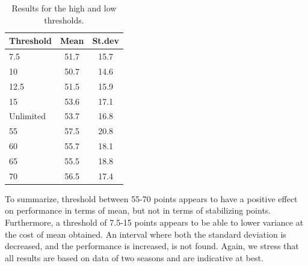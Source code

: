 \begin{table}[H]
\centering
\begin{tabular}{@{}lcc@{}}
\toprule
Threshold & Mean & St.dev \\ \midrule
7.5       & 51.7 & 15.7   \\
10        & 50.7 & 14.6   \\        %
12.5      & 51.5 & 15.9   \\
15        & 53.6 & 17.1   \\
Unlimited & 53.7 & 16.8   \\
55        & 57.5 & 20.8   \\
60        & 55.7 & 18.1   \\
65        & 55.5 & 18.8   \\
70        & 56.5 & 17.4   \\ \bottomrule 
\end{tabular}
\caption{Results for the high and low thresholds.}
\label{tab_high_low_thresholds}
\end{table}

\newpar

To summarize, threshold between 55-70 points appears to have a positive effect on performance in terms of mean, but not in terms of stabilizing points. Furthermore, a threshold of 7.5-15 points appears to be able to lower variance at the cost of mean obtained. An interval where both the standard deviation is decreased, and the performance is increased, is not found. Again, we stress that all results are based on data of two seasons and are indicative at best.







\newpar

